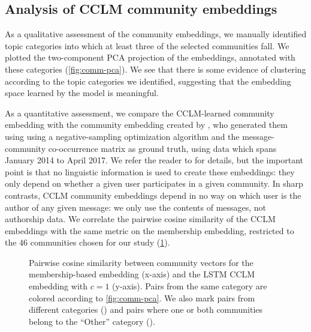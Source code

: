 \documentclass[11pt,a4paper]{article}
\begin{document}
\subsection{Analysis of CCLM community embeddings}

As a qualitative assessment of the community embeddings, 
we manually identified topic categories into which at least three
of the selected communities fall.
We plotted the two-component PCA projection of the embeddings,
annotated with these categories (\cref{fig:comm-pca}).
We see that there is some evidence of clustering according to
the topic categories we identified,
suggesting that the embedding space learned by the model is meaningful.

\begin{figure*}
\caption{Community embedding PCA of the best LSTM (left, $c=1$) and transformer (right, $c=3$) models.}
\label{fig:comm-pca}
\end{figure*}

As a quantitative assessment, we compare the CCLM-learned community
embedding with the community embedding created by \citet{Kumar2018},
who generated them using using a negative-sampling optimization
algorithm and the message-community co-occurrence matrix as ground
truth, using data which spans January 2014 to April 2017.
We refer the reader
to \citet{Kumar2018}
for details, but the important point is that no linguistic
information is used to create these embeddings: they only depend on
whether a given user participates in a given
community. In sharp contrasts, CCLM community embeddings depend in no
way on which user is the author of any given message: we only use the
contents of messages, not authorship data.
%
We correlate the pairwise cosine similarity of the
CCLM embeddings with the same metric on the membership embedding,
restricted to the 46 communities chosen for our study
(\cref{fig:pairwise-comm-sim}).

\begin{figure}
  \caption{Pairwise cosine similarity between community vectors for 
    the membership-based embedding (x-axis) and
  the LSTM CCLM embedding with $c=1$ (y-axis). 
  Pairs from the same category are colored according to \cref{fig:comm-pca}.
  We also mark pairs from different categories (\texttimes) and pairs where one or both
  communities belong to the ``Other'' category (\textbigcircle).
  }
  \label{fig:pairwise-comm-sim}
\end{figure}
\end{document}
